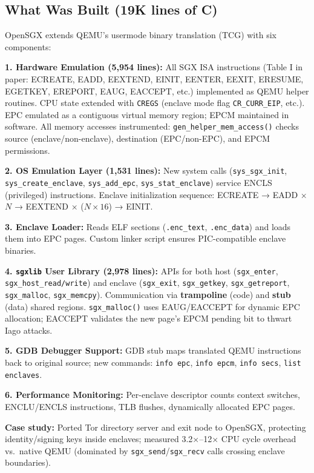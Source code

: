 \documentclass[11pt,letterpaper]{article}
\begin{document}
\subsection*{What Was Built (19K lines of C)}
OpenSGX extends QEMU's usermode binary translation (TCG) with six components:

\textbf{1. Hardware Emulation (5,954 lines):}
All SGX ISA instructions (Table I in paper: ECREATE, EADD, EEXTEND, EINIT, EENTER, EEXIT, ERESUME, EGETKEY, EREPORT, EAUG, EACCEPT, etc.) implemented as QEMU helper routines.
CPU state extended with \texttt{CREGS} (enclave mode flag \texttt{CR\_CURR\_EIP}, etc.).
EPC emulated as a contiguous virtual memory region; EPCM maintained in software.
All memory accesses instrumented: \texttt{gen\_helper\_mem\_access()} checks source (enclave/non-enclave), destination (EPC/non-EPC), and EPCM permissions.

\textbf{2. OS Emulation Layer (1,531 lines):}
New system calls (\texttt{sys\_sgx\_init}, \texttt{sys\_create\_enclave}, \texttt{sys\_add\_epc}, \texttt{sys\_stat\_enclave}) service ENCLS (privileged) instructions.
Enclave initialization sequence: ECREATE → EADD × $N$ → EEXTEND × ($N \times 16$) → EINIT.

\textbf{3. Enclave Loader:}
Reads ELF sections (\texttt{.enc\_text}, \texttt{.enc\_data}) and loads them into EPC pages.
Custom linker script ensures PIC-compatible enclave binaries.

\textbf{4. \texttt{sgxlib} User Library (2,978 lines):}
APIs for both host (\texttt{sgx\_enter}, \texttt{sgx\_host\_read/write}) and enclave (\texttt{sgx\_exit}, \texttt{sgx\_getkey}, \texttt{sgx\_getreport}, \texttt{sgx\_malloc}, \texttt{sgx\_memcpy}).
Communication via \textbf{trampoline} (code) and \textbf{stub} (data) shared regions.
\texttt{sgx\_malloc()} uses EAUG/EACCEPT for dynamic EPC allocation; EACCEPT validates the new page's EPCM pending bit to thwart Iago attacks.

\textbf{5. GDB Debugger Support:}
GDB stub maps translated QEMU instructions back to original source; new commands: \texttt{info epc}, \texttt{info epcm}, \texttt{info secs}, \texttt{list enclaves}.

\textbf{6. Performance Monitoring:}
Per-enclave descriptor counts context switches, ENCLU/ENCLS instructions, TLB flushes, dynamically allocated EPC pages.

\textbf{Case study:} Ported Tor directory server and exit node to OpenSGX, protecting identity/signing keys inside enclaves; measured 3.2$\times$--12$\times$ CPU cycle overhead vs.\ native QEMU (dominated by \texttt{sgx\_send}/\texttt{sgx\_recv} calls crossing enclave boundaries).
\end{document}
